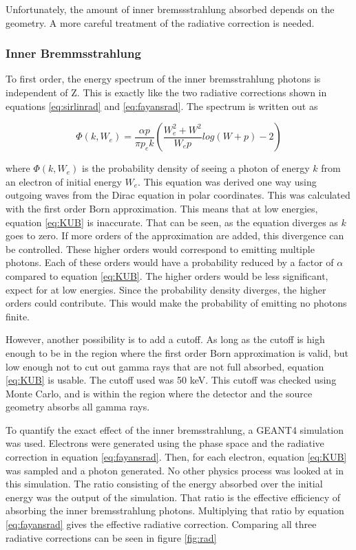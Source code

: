 \documentclass[../MaxHughesThesis.tex]{subfiles}
\begin{document}
Unfortunately, the amount of inner bremssstrahlung absorbed depends on the geometry.
A more careful treatment of the radiative correction is needed.

\subsubsection{Inner Bremmsstrahlung}

To first order, the energy spectrum of the inner bremsstrahlung photons is independent of Z.
This is exactly like the two radiative corrections shown in equations \ref{eq:sirlinrad} and \ref{eq:fayansrad}. 
The spectrum is written out as \cite{Kni36}%

\begin{equation}
	\Phi(k,W_{e}) = \frac{ \alpha p}{ \pi p_{e} k} ( \frac{W_{e}^{2} + W^{2}}{W_{e}p}log(W + p) - 2 )
	\label{eq:KUB}
\end{equation}

where $\Phi(k,W_{e})$ is the probability density of seeing a photon of energy $k$ from an electron of initial energy $W_{e}$.
This equation was derived one way using outgoing waves from the Dirac equation in polar coordinates.
This was calculated with the first order Born approximation.
This means that at low energies, equation \ref{eq:KUB} is inaccurate. 
That can be seen, as the equation diverges as $k$ goes to zero.
If more orders of the approximation are added, this divergence can be controlled.
These higher orders would correspond to emitting multiple photons.
Each of these orders would have a probability reduced by a factor of $\alpha$ compared to equation \ref{eq:KUB}.
The higher orders would be less significant, expect for at low energies. 
Since the probability density diverges, the higher orders could contribute.
This would make the probability of emitting no photons finite.	 		

However, another possibility is to add a cutoff. 
As long as the cutoff is high enough to be in the region where the first order Born approximation is valid, but low enough not to cut out gamma rays that are not full absorbed, equation \ref{eq:KUB} is usable.
The cutoff used was 50 keV.
This cutoff was checked using Monte Carlo, and is within the region where the detector and the source geometry absorbs all gamma rays.

To quantify the exact effect of the inner bremsstrahlung, a GEANT4 simulation was used.
Electrons were generated using the phase space and the radiative correction in equation \ref{eq:fayansrad}.
Then, for each electron, equation \ref{eq:KUB} was sampled and a photon generated.
No other physics process was looked at in this simulation.
The ratio consisting of the energy absorbed over the initial energy was the output of the simulation.
That ratio is the effective efficiency of absorbing the inner bremsstrahlung photons.
Multiplying that ratio by equation \ref{eq:fayansrad} gives the effective radiative correction.
Comparing all three radiative corrections can be seen in figure \ref{fig:rad}
\end{document}
